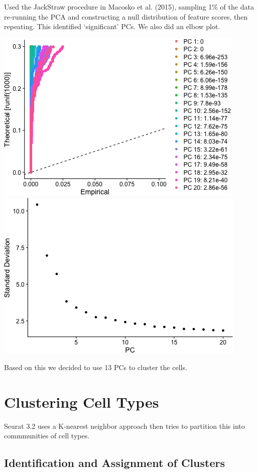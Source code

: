 \documentclass[]{article}
\begin{document}
Used the JackStraw procedure in Macosko et al. (2015), sampling 1\% of
the data re-running the PCA and constructing a null distribution of
feature scores, then repeating. This identified `significant' PCs. We
also did an elbow plot.

\includegraphics{figures/cluster-numbers-1.png}
\includegraphics{figures/cluster-numbers-2.png}

Based on this we decided to use 13 PCs to cluster the cells.

\hypertarget{clustering-cell-types}{%
\section{Clustering Cell Types}\label{clustering-cell-types}}

Seurat 3.2 uses a K-nearest neighbor approach then tries to partition
this into commmunities of cell types.

\hypertarget{identification-and-assignment-of-clusters}{%
\subsection{Identification and Assignment of
Clusters}\label{identification-and-assignment-of-clusters}}
\end{document}
